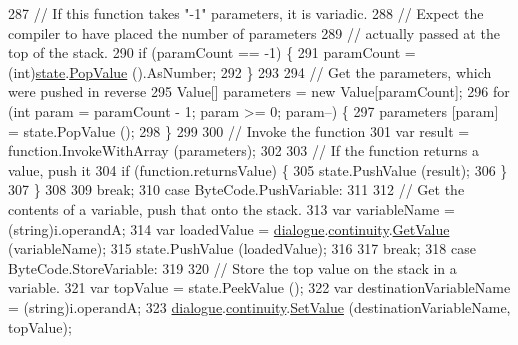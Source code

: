 \begin{DoxyCode}
287                     \textcolor{comment}{// If this function takes "-1" parameters, it is variadic.}
288                     \textcolor{comment}{// Expect the compiler to have placed the number of parameters}
289                     \textcolor{comment}{// actually passed at the top of the stack.}
290                     \textcolor{keywordflow}{if} (paramCount == -1) \{
291                         paramCount = (int)\hyperlink{a00086_a70f2ce6201cdd2430ceaa764ac614ca0}{state}.\hyperlink{a00089_a36881a888ea2839d74c3d4e7c199f4ee}{PopValue} ().AsNumber;
292                     \}
293 
294                     \textcolor{comment}{// Get the parameters, which were pushed in reverse}
295                     Value[] parameters = \textcolor{keyword}{new} Value[paramCount];
296                     \textcolor{keywordflow}{for} (\textcolor{keywordtype}{int} param = paramCount - 1; param >= 0; param--) \{
297                         parameters [param] = state.PopValue ();
298                     \}
299 
300                     \textcolor{comment}{// Invoke the function}
301                     var result = function.InvokeWithArray (parameters);
302 
303                     \textcolor{comment}{// If the function returns a value, push it}
304                     \textcolor{keywordflow}{if} (\textcolor{keyword}{function}.returnsValue) \{
305                         state.PushValue (result);
306                     \}
307                 \}
308 
309                 \textcolor{keywordflow}{break};
310             \textcolor{keywordflow}{case} ByteCode.PushVariable:
311 
312                 \textcolor{comment}{// Get the contents of a variable, push that onto the stack.}
313                 var variableName = (string)i.operandA;
314                 var loadedValue = \hyperlink{a00086_ac506426c503da5f033247c29e11c5e82}{dialogue}.\hyperlink{a00050_ae94eaa4b03b432422f5d205fabe37ff5}{continuity}.\hyperlink{a00102_accab1fc5c8fc353dbfc53ca0f4029576}{GetValue} (variableName);
315                 state.PushValue (loadedValue);
316 
317                 \textcolor{keywordflow}{break};
318             \textcolor{keywordflow}{case} ByteCode.StoreVariable:
319 
320                 \textcolor{comment}{// Store the top value on the stack in a variable.}
321                 var topValue = state.PeekValue ();
322                 var destinationVariableName = (string)i.operandA;
323                 \hyperlink{a00086_ac506426c503da5f033247c29e11c5e82}{dialogue}.\hyperlink{a00050_ae94eaa4b03b432422f5d205fabe37ff5}{continuity}.\hyperlink{a00102_aa90ff61224432c5ed3ce72199c55f440}{SetValue} (destinationVariableName, topValue);

\end{DoxyCode}
